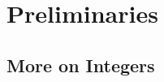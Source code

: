 \documentclass[11pt,a4paper]{book}
\begin{document}
\chapter{Preliminaries}

\section{More on Integers}




\end{document}
